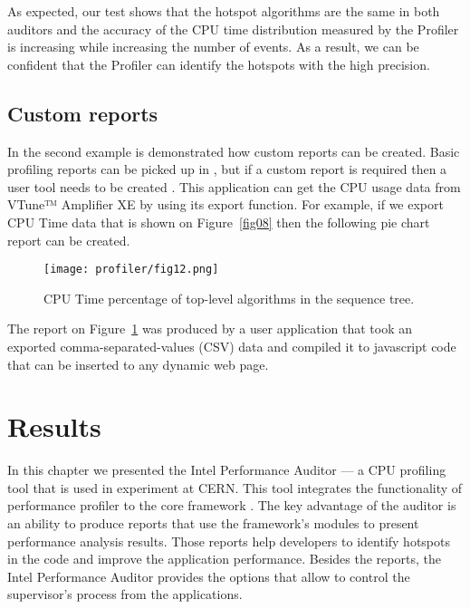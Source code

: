 As expected, our test shows that the hotspot algorithms are the same in both
auditors and the accuracy of the CPU time distribution measured by the Profiler
is increasing while increasing the number of events. As a result, we can be
confident that the Profiler can identify the hotspots with the high precision.

\subsection{Custom reports}

In the second example is demonstrated how custom reports can be created. Basic
profiling reports can be picked up in
\amp, but if a custom report is required then a user tool needs to be created .
This application can get the CPU usage data from VTune™ Amplifier XE by using
its export function. For example, if we export CPU Time data that is shown on
Figure~\ref{fig08} then the following pie chart report can be created.

\begin{figure}[H]
\begin{minipage}{\textwidth}
\begin{center}
\texttt{[image: profiler/fig12.png]}
\caption{\label{fig12}CPU Time percentage of top-level algorithms in the \gaudi sequence tree.}
\end{center}
\end{minipage}
\end{figure}

The report on Figure~\ref{fig12} was produced by a user application that took
an exported  comma-separated-values (CSV) data and compiled it to javascript
code that can be inserted to any dynamic web page.

\section{Results}
In this chapter we presented the \gaudi Intel Performance Auditor --- a CPU
profiling tool that is used in \lhcb experiment at CERN. This tool integrates
the functionality of \iamp performance profiler to the \lhcb core framework
\gaudi. The key advantage of the auditor is an ability to produce reports that
use the framework's modules to present performance analysis results. Those
reports help  developers to identify hotspots in the code and improve the
application performance. Besides the reports, the \gaudi Intel Performance
Auditor provides the options that allow to control the \iamp supervisor’s
process from the \gaudi applications.

